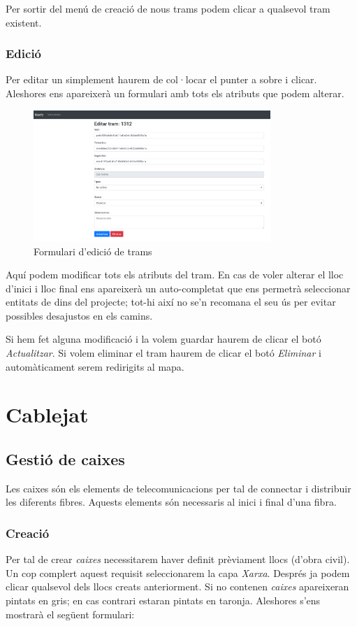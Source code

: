 \documentclass[a4paper]{article}
\begin{document}
	Per sortir del menú de creació de nous trams podem clicar a qualsevol tram existent.
	
	\subsubsection{Edició}
	Per editar un simplement haurem de col·locar el punter a sobre i clicar. Aleshores ens apareixerà un formulari amb tots els atributs que podem alterar.
	
	\begin{figure}[H]
		\centering
		\includegraphics[width=0.8\textwidth]{images/path_edit.png}
		\caption{Formulari d'edició de trams}
	\end{figure}
	Aquí podem modificar tots els atributs del tram. En cas de voler alterar el lloc d'inici i lloc final ens apareixerà un auto-completat que ens permetrà seleccionar entitats de dins del projecte; tot-hi així no se'n recomana el seu ús per evitar possibles desajustos en els camins.
	
	Si hem fet alguna modificació i la volem guardar haurem de clicar el botó \emph{Actualitzar}.
	Si volem eliminar el tram haurem de clicar el botó \emph{Eliminar} i automàticament serem redirigits al mapa.
	
	\newpage
	\section{Cablejat}
	\subsection{Gestió de caixes}
	Les caixes són els elements de telecomunicacions per tal de connectar i distribuir les diferents fibres. Aquests elements són necessaris al inici i final d'una fibra.
	
	\subsubsection{Creació}
	Per tal de crear \emph{caixes} necessitarem haver definit prèviament llocs (d'obra civil). Un cop complert aquest requisit seleccionarem la capa \emph{Xarxa}. Després ja podem clicar qualsevol dels llocs creats anteriorment. Si no contenen \emph{caixes} apareixeran pintats en gris; en cas contrari estaran pintats en taronja. Aleshores s'ens mostrarà el següent formulari:
	
\end{document}
